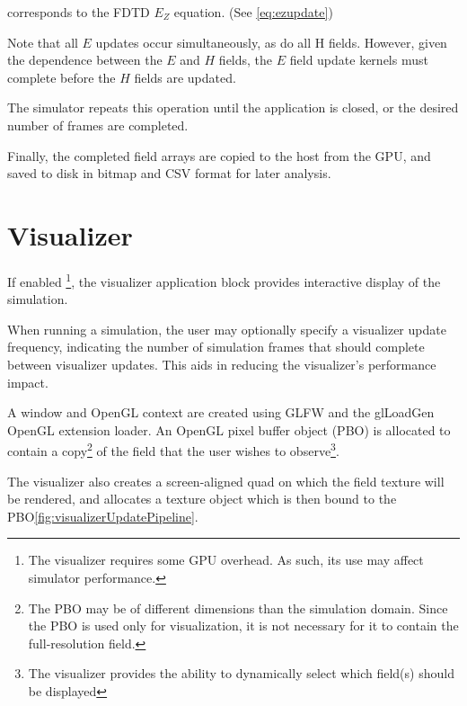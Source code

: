 corresponds to the FDTD $E_Z$ equation. (See \autoref{eq:ezupdate})

\label{listing:updateHxCpp}

\label{listing:updateHyCpp}

Note that all $E$ updates occur simultaneously, as do all H fields. However, given the dependence between the $E$ and $H$ fields, the $E$ field update kernels must complete before the $H$ fields are updated.

The simulator repeats this operation until the application is closed, or the desired number of frames are completed. 

Finally, the completed field arrays are copied to the host from the GPU, and saved to disk in bitmap and CSV format for later analysis. 

\section{Visualizer}\label{sec:visualizer}

If enabled \footnote{The visualizer requires some GPU overhead. As such, its use may affect simulator performance.}, the visualizer application block provides interactive display of the simulation. 

When running a simulation, the user may optionally specify a visualizer update frequency, indicating the number of simulation frames that should complete between visualizer updates. This aids in reducing the visualizer's performance impact.

A window and OpenGL context are created using GLFW and the glLoadGen OpenGL extension loader. An OpenGL pixel buffer object (PBO) is allocated to contain a copy\footnote{The PBO may be of different dimensions than the simulation domain. Since the PBO is used only for visualization, it is not necessary for it to contain the full-resolution field.} of the field that the user wishes to observe\footnote{The visualizer provides the ability to dynamically select which field(s) should be displayed}. 

The visualizer also creates a screen-aligned quad on which the field texture will be rendered, and allocates a texture object which is then bound to the PBO\autoref{fig:visualizerUpdatePipeline}.

